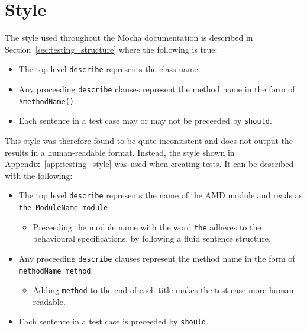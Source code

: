 \section{Style} {
\label{sec:testing_style}

	The style used throughout the Mocha documentation is described in Section~\ref{sec:testing_structure} where the following is true:

	\begin{itemize}
		\item The top level \texttt{describe} represents the class name.
		\item Any proceeding \texttt{describe} clauses represent the method name in the form of \texttt{\#methodName()}.
		\item Each sentence in a test case may or may not be preceeded by \texttt{should}.
	\end{itemize}

	This style was therefore found to be quite inconsistent and does not output the results in a human-readable format. Instead, the style shown in Appendix~\ref{app:testing_style} was used when creating tests. It can be described with the following:

	\begin{itemize}
		\item The top level \texttt{describe} represents the name of the AMD module and reads as \texttt{the ModuleName module}.
			\begin{itemize}
				\item Preceeding the module name with the word \texttt{the} adheres to the behavioural specifications, by following a fluid sentence structure.
			\end{itemize}
		\item Any proceeding \texttt{describe} clauses represent the method name in the form of \texttt{methodName method}.
			\begin{itemize}
				\item Adding \texttt{method} to the end of each title makes the test case more human-readable.
			\end{itemize}
		\item Each sentence in a test case is preceeded by \texttt{should}.
	\end{itemize}

}


